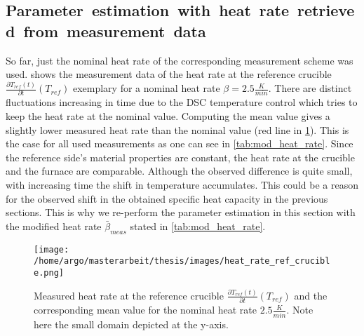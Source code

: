 \documentclass{scrartcl}[12pt, halfparskip]
\numberwithin{equation}{section}
\numberwithin{figure}{section}
\numberwithin{table}{section}
\begin{document}
\subsection{\mbox{Parameter estimation with heat rate retrieved from measurement data}}
\label{sec:param_estimation_mod_heat_rate_FS}
So far, just the nominal heat rate of the corresponding measurement scheme was used. 
 shows the measurement data of the heat rate at the reference crucible $\frac{\partial T_{ref}(t)}{\partial t}(T_{ref})$ exemplary for a nominal heat rate $\beta = 2.5 \frac{K}{min}$. 
There are distinct fluctuations increasing in time due to the DSC temperature control which tries to keep the heat rate at the nominal value. 
Computing the mean value gives a slightly lower measured heat rate than the nominal value (red line in \cref{fig:heat_rate_measurement}). 
This is the case for all used measurements as one can see in \cref{tab:mod_heat_rate}. 
Since the reference side's material properties are constant, the heat rate at the crucible and the furnace are comparable.
Although the observed difference is quite small, with increasing time the shift in temperature accumulates.
This could be a reason for the observed shift in the obtained specific heat capacity in the previous sections.
This is why we re-perform the parameter estimation in this section with the modified heat rate $\bar{\beta}_{meas}$ stated in \cref{tab:mod_heat_rate}.


\begin{figure}[H]
	\centering
	\texttt{[image: /home/argo/masterarbeit/thesis/images/heat\_rate\_ref\_crucible.png]}
	\caption{Measured heat rate at the reference crucible $\frac{\partial T_{ref}(t)}{\partial t}(T_{ref})$ and the corresponding mean value for the nominal heat rate $2.5 \frac{K}{min}$. Note here the small domain depicted at the y-axis.}
	\label{fig:heat_rate_measurement}
\end{figure}
\end{document}
